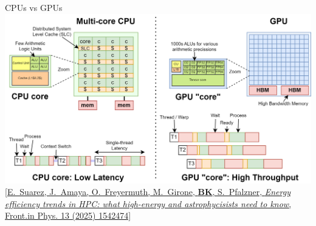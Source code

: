 \begin{frame}{CPUs vs GPUs}
  \centering
  \includegraphics[height=0.8\paperheight]{graphics/cpuVSgpu.png}\\
  \footnotesize{\href{https://www.frontiersin.org/journals/physics/articles/10.3389/fphy.2025.1542474/full}{[E.~Suarez, J.~Amaya, O.~Freyermuth, M.~Girone, \textbf{BK}, S.~Pfalzner, \emph{Energy efficiency trends in HPC: what high-energy and astrophycisists need to know}, Front.in Phys. 13 (2025) 1542474]}}
\end{frame}                                                    


